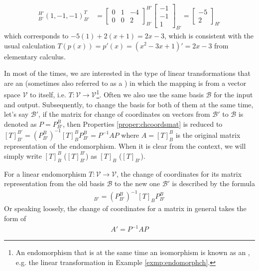 \begin{solution}
\begin{align*}
[T]_{B'}^{H'} (1,-1,-1)^T_{B'} &= 
\begin{bmatrix}
0 & 1 & -4 \\
0 & 0 & 2
\end{bmatrix}_{B'}^{H'}
\begin{bmatrix}
-1 \\
-1 \\
1
\end{bmatrix}_{B'}
=
\begin{bmatrix}
-5 \\
2
\end{bmatrix}_{H'}
\end{align*}
which corresponds to $-5(1) + 2(x+1) = 2x-3$, which is consistent with the usual calculation $T(p(x)) = p'(x) = (x^2-3x+1)' = 2x-3$ from elementary calculus.
\end{solution}

In most of the times, we are interested in the type of linear transformations that are an  (sometimes also referred to as a ) in which the mapping is from a vector space $\mathcal{V}$ to itself, i.e. $T: \mathcal{V} \to \mathcal{V}$\footnote{An endomorphism that is at the same time an isomorphism is known as an , e.g. the linear transformation in Example \ref{exmp:endomorphch}.}. Often we also use the same basis $\mathcal{B}$ for the input and output. Subsequently, to change the basis for both of them at the same time, let's say $\mathcal{B}'$, if the matrix for change of coordinates on vectors from $\mathcal{B}'$ to $\mathcal{B}$ is denoted as $P = P_{B'}^B$, then Properties \ref{proper:chcoordsmat} is reduced to $[T]_{B'}^{B'} = (P_{B'}^B)^{-1} [T]_B^B P_{B'}^B = P^{-1}AP$ where $A = [T]_B^B$ is the original matrix representation of the endomorphism. When it is clear from the context, we will simply write $[T]_B^B$ ($[T]_{B'}^{B'}$) as $[T]_B$ ($[T]_{B'}$).
\begin{proper}
\label{proper:endomorph}
For a linear endomorphism $T: \mathcal{V} \to \mathcal{V}$, the change of coordinates for its matrix representation from the old basis $\mathcal{B}$ to the new one $\mathcal{B}'$ is described by the formula
\begin{align*}
[T]_{B'} = (P_{B'}^B)^{-1} [T]_B P_{B'}^B    
\end{align*}
Or speaking loosely, the change of coordinates for a matrix in general takes the form of
\begin{align*}
A' = P^{-1}AP
\end{align*}
\end{proper}

